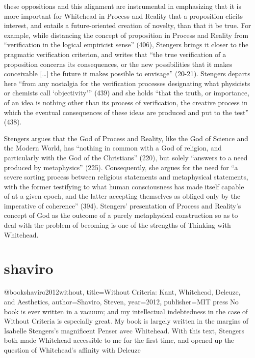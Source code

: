these oppositions and this alignment are instrumental in emphasizing that it is
more important for Whitehead in Process and Reality that a proposition elicits
interest, and entails a future-oriented creation of novelty, than that it be true.
For
example, while distancing the concept of proposition in Process and Reality from
“verification in the logical empiricist sense” (406), Stengers brings it closer to the
pragmatic verification criterion, and writes that “the true verification of a proposition
concerns its consequences, or the new possibilities that it makes conceivable […] the
future it makes possible to envisage” (20-21).
Stengers departs here “from any
nostalgia for the verification processes designating what physicists or chemists call
‘objectivity’” (439) and she holds “that the truth, or importance, of an idea is nothing
other than its process of verification, the creative process in which the eventual
consequences of these ideas are produced and put to the test” (438).

Stengers
argues that the God of Process and Reality, like the God of Science and the Modern
World, has “nothing in common with a God of religion, and particularly with the God
of the Christians” (220), but solely “answers to a need produced by metaphysics”
(225). Consequently, she argues for the need for “a severe sorting process between
religious statements and metaphysical statements, with the former testifying to what
human consciousness has made itself capable of at a given epoch, and the latter
accepting themselves as obliged only by the imperative of coherence” (394).
Stengers’ presentation of Process and Reality’s concept of God as the outcome of a
purely metaphysical construction so as to deal with the problem of becoming is one of
the strengths of Thinking with Whitehead.

\section{shaviro}
@book{shaviro2012without,
	title={Without Criteria: Kant, Whitehead, Deleuze, and Aesthetics},
	author={Shaviro, Steven},
	year={2012},
	publisher={MIT press}
}
No book is ever written in a vacuum; and my intellectual indebtedness
in the case of Without Criteria is especially great. My book is largely written in
the margins of Isabelle Stengers’s magnificent Penser avec Whitehead. With this
text, Stengers both made Whitehead accessible to me for the first time, and
opened up the question of Whitehead’s affinity with Deleuze

